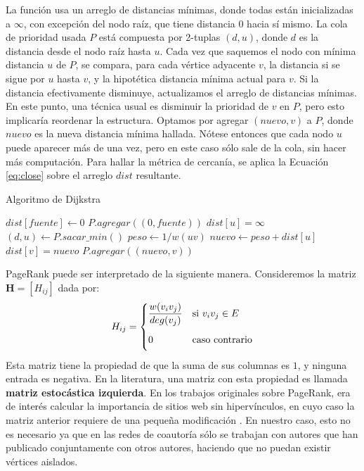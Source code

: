 \documentclass[journal]{IEEEtran}
\let\MYoriglatexcaption\caption
\renewcommand{\caption}[2][\relax]{\MYoriglatexcaption[#2]{#2}}
\newcommand{\matr}[1]{\mathbf{#1}} %
\begin{document}
La función  usa un arreglo de distancias mínimas, donde todas están inicializadas a \(\infty\), con excepción del nodo raíz, que tiene distancia \(0\) hacia sí mismo. La cola de prioridad usada \(P\) está compuesta por 2-tuplas \((d, u)\), donde \(d\) es la distancia desde el nodo raíz hasta \(u\). Cada vez que saquemos el nodo con mínima distancia \(u\) de \(P\), se compara, para cada vértice adyacente \(v\), la distancia si se sigue por \(u\) hasta \(v\), y la hipotética distancia mínima actual para \(v\). Si la distancia efectivamente disminuye, actualizamos el arreglo de distancias mínimas. En este punto, una técnica usual es disminuir la prioridad de \(v\) en \(P\)\cite{heap}, pero esto implicaría reordenar la estructura. Optamos por agregar \((nuevo, v)\) a \(P\), donde \(nuevo\) es la nueva distancia mínima hallada. Nótese entonces que cada nodo \(u\) puede aparecer más de una vez, pero en este caso sólo sale de la cola, sin hacer más computación. Para hallar la métrica de cercanía, se aplica la Ecuación \ref{eq:close} sobre el arreglo \(dist\) resultante.
\begin{algorithm}[H]
	\caption{Algoritmo de Dijkstra} \label{alg:dijkstra}
\begin{algorithmic}
		\State $dist[fuente] \gets 0$
		\State $P.agregar((0, fuente))$
			\State $dist[u] = \infty$
		\EndFor
			\State $(d, u) \gets P.sacar\_min()$
					\State $peso \gets 1/w(uv)$
					\State $nuevo \gets peso + dist[u]$
						\State $dist[v] = nuevo$
						\State $P.agregar((nuevo, v))$
					\EndIf
				\EndFor	
			\EndIf
		\EndWhile
	\EndFunction
\end{algorithmic}
\end{algorithm}
PageRank puede ser interpretado de la siguiente manera. Consideremos la matriz \(\matr{H} = [H_{ij}]\) dada por:
\begin{equation}
	H_{ij} =
	\begin{dcases}
	\frac{w(v_i v_j)}{deg(v_j)} &\text{si $v_i v_j \in E$}\\
	0\phantom{\frac{1}{|V|}} &\text{caso contrario}
	\end{dcases}
\end{equation}
Esta matriz tiene la propiedad de que la suma de sus columnas es \(1\), y ninguna entrada es negativa. En la literatura, una matriz con esta propiedad es llamada \textbf{matriz estocástica izquierda}. En los trabajos originales sobre PageRank, era de interés calcular la importancia de sitios web sin hipervínculos, en cuyo caso la matriz anterior requiere de una pequeña modificación \cite{google}. En nuestro caso, esto no es necesario ya que en las redes de coautoría sólo se trabajan con autores que han publicado conjuntamente con otros autores, haciendo que no puedan existir vértices aislados.
\end{document}
